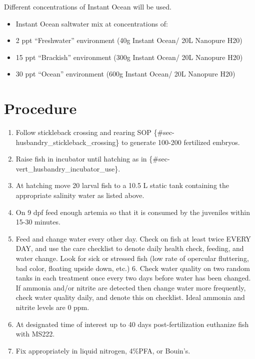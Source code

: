 \documentclass[
  letterpaper,
  DIV=11,
  numbers=noendperiod]{scrreprt}
\providecommand{\tightlist}{%
  \setlength{\itemsep}{0pt}\setlength{\parskip}{0pt}}\usepackage{longtable,booktabs,array}
\begin{document}
Different concentrations of Instant Ocean will be used.

\begin{itemize}
\tightlist
\item
  Instant Ocean saltwater mix at concentrations of:
\item
  2 ppt ``Freshwater'' environment (40g Instant Ocean/ 20L Nanopure H20)
\item
  15 ppt ``Brackish'' environment (300g Instant Ocean/ 20L Nanopure H20)
\item
  30 ppt ``Ocean'' environment (600g Instant Ocean/ 20L Nanopure H20)
\end{itemize}

\hypertarget{procedure-54}{%
\section{Procedure}\label{procedure-54}}

\begin{enumerate}
\def\labelenumi{\arabic{enumi}.}
\tightlist
\item
  Follow stickleback crossing and rearing SOP
  \{\#sec-husbandry\_stickleback\_crossing\} to generate 100-200
  fertilized embryos.
\item
  Raise fish in incubator until hatching as in
  \{\#sec-vert\_husbandry\_incubator\_use\}.
\item
  At hatching move 20 larval fish to a 10.5 L static tank containing the
  appropriate salinity water as listed above.
\item
  On 9 dpf feed enough artemia so that it is consumed by the juveniles
  within 15-30 minutes.
\item
  Feed and change water every other day. Check on fish at least twice
  EVERY DAY, and use the care checklist to denote daily health check,
  feeding, and water change. Look for sick or stressed fish (low rate of
  opercular fluttering, bad color, floating upside down, etc.) 6. Check
  water quality on two random tanks in each treatment once every two
  days before water has been changed. If ammonia and/or nitrite are
  detected then change water more frequently, check water quality daily,
  and denote this on checklist. Ideal ammonia and nitrite levels are 0
  ppm.
\item
  At designated time of interest up to 40 days post-fertilization
  euthanize fish with MS222.
\item
  Fix appropriately in liquid nitrogen, 4\%PFA, or Bouin's.
\end{enumerate}
\end{document}
